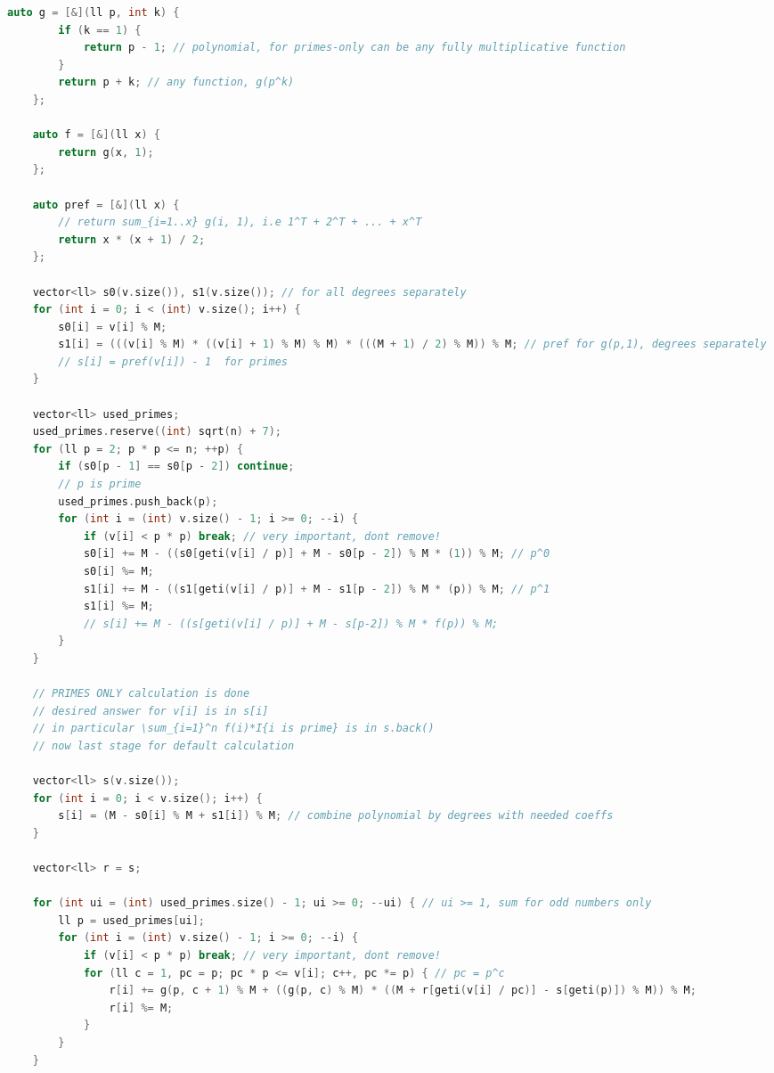 \documentclass[9pt,a4paper,landscape,twosided]{extarticle}
\begin{document}
\begin{multicols*}{3}
\begin{lstlisting}[language=C++]
    auto g = [&](ll p, int k) {
        if (k == 1) {
            return p - 1; // polynomial, for primes-only can be any fully multiplicative function
        }
        return p + k; // any function, g(p^k)
    };

    auto f = [&](ll x) {
        return g(x, 1);
    };

    auto pref = [&](ll x) {
        // return sum_{i=1..x} g(i, 1), i.e 1^T + 2^T + ... + x^T
        return x * (x + 1) / 2;
    };

    vector<ll> s0(v.size()), s1(v.size()); // for all degrees separately
    for (int i = 0; i < (int) v.size(); i++) {
        s0[i] = v[i] % M;
        s1[i] = (((v[i] % M) * ((v[i] + 1) % M) % M) * (((M + 1) / 2) % M)) % M; // pref for g(p,1), degrees separately
        // s[i] = pref(v[i]) - 1  for primes
    }

    vector<ll> used_primes;
    used_primes.reserve((int) sqrt(n) + 7);
    for (ll p = 2; p * p <= n; ++p) {
        if (s0[p - 1] == s0[p - 2]) continue;
        // p is prime
        used_primes.push_back(p);
        for (int i = (int) v.size() - 1; i >= 0; --i) {
            if (v[i] < p * p) break; // very important, dont remove!
            s0[i] += M - ((s0[geti(v[i] / p)] + M - s0[p - 2]) % M * (1)) % M; // p^0
            s0[i] %= M;
            s1[i] += M - ((s1[geti(v[i] / p)] + M - s1[p - 2]) % M * (p)) % M; // p^1
            s1[i] %= M;
            // s[i] += M - ((s[geti(v[i] / p)] + M - s[p-2]) % M * f(p)) % M;
        }
    }

    // PRIMES ONLY calculation is done
    // desired answer for v[i] is in s[i]
    // in particular \sum_{i=1}^n f(i)*I{i is prime} is in s.back()
    // now last stage for default calculation

    vector<ll> s(v.size());
    for (int i = 0; i < v.size(); i++) {
        s[i] = (M - s0[i] % M + s1[i]) % M; // combine polynomial by degrees with needed coeffs
    }

    vector<ll> r = s;

    for (int ui = (int) used_primes.size() - 1; ui >= 0; --ui) { // ui >= 1, sum for odd numbers only
        ll p = used_primes[ui];
        for (int i = (int) v.size() - 1; i >= 0; --i) {
            if (v[i] < p * p) break; // very important, dont remove!
            for (ll c = 1, pc = p; pc * p <= v[i]; c++, pc *= p) { // pc = p^c
                r[i] += g(p, c + 1) % M + ((g(p, c) % M) * ((M + r[geti(v[i] / pc)] - s[geti(p)]) % M)) % M;
                r[i] %= M;
            }
        }
    }


\end{lstlisting}
\end{multicols*}
\end{document}
